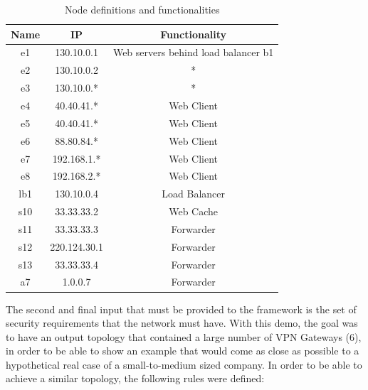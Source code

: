 \begin{table}[h]
    \centering
    \begin{tabular}{ccc}
        \hline
         Name & IP & Functionality \\
        \hline
        e1 & 130.10.0.1 & Web servers behind load balancer b1 \\
        e2 & 130.10.0.2 & * \\
        e3 & 130.10.0.* & * \\
        e4 & 40.40.41.* & Web Client \\ 
        e5 & 40.40.41.* & Web Client \\
        e6 & 88.80.84.* & Web Client \\
        e7 & 192.168.1.* & Web Client \\
        e8 & 192.168.2.* & Web Client \\
        lb1 & 130.10.0.4 & Load Balancer \\
        s10 & 33.33.33.2 & Web Cache \\
        s11 & 33.33.33.3 & Forwarder \\
        s12 & 220.124.30.1 & Forwarder \\
        s13 & 33.33.33.4 & Forwarder \\
        a7 & 1.0.0.7 & Forwarder \\
        \hline
    \end{tabular}
    \caption{Node definitions and functionalities}
    \label{tab:tabella}
\end{table}


The second and final input that must be provided to the framework is the set of security requirements that the network must have. With this demo, the goal was to have an output topology that contained a large number of VPN Gateways (6), in order to be able to show an example that would come as close as possible to a hypothetical real case of a small-to-medium sized company. In order to be able to achieve a similar topology, the following rules were defined:
\\
\\

